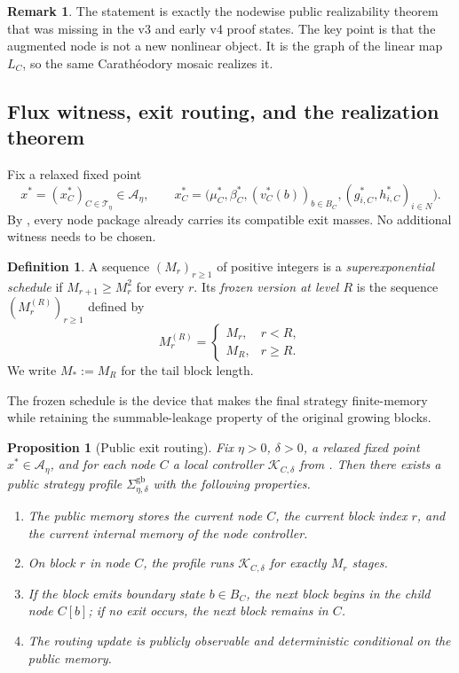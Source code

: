 \documentclass[12pt]{article}
\newtheorem{proposition}[theorem]{Proposition}
\theoremstyle{definition}
\newtheorem{definition}[theorem]{Definition}
\newtheorem{remark}[theorem]{Remark}
\newcommand{\1}{\mathbf{1}}
\newcommand{\cA}{\mathcal{A}}
\newcommand{\cK}{\mathcal{K}}
\newcommand{\cT}{\mathcal{T}}
\begin{document}
\begin{remark}
The statement is exactly the nodewise public realizability theorem that was missing in the
v3 and early v4 proof states.  The key point is that the augmented node is not a new
nonlinear object.  It is the graph of the linear map \(L_C\), so the same
Carath\'eodory mosaic realizes it.
\end{remark}

\subsection{Flux witness, exit routing, and the realization theorem}

Fix a relaxed fixed point
\[
x^*=(x_C^*)_{C\in \cT_\eta}\in \cA_\eta,
\qquad
x_C^*=\bigl(\mu_C^*,\beta_C^*,(v_C^*(b))_{b\in B_C},(g_{i,C}^*,h_{i,C}^*)_{i\in N}\bigr).
\]
By , every node package already carries its compatible exit masses.  No
additional witness needs to be chosen.

\begin{definition}
A sequence \((M_r)_{r\ge 1}\) of positive integers is a \emph{superexponential schedule}
if \(M_{r+1}\ge M_r^2\) for every \(r\).  Its \emph{frozen version at level \(R\)} is the
sequence \((M_r^{(R)})_{r\ge 1}\) defined by
\[
M_r^{(R)}=
\begin{cases}
M_r, & r<R,\\
M_R, & r\ge R.
\end{cases}
\]
We write \(M_*:=M_R\) for the tail block length.
\end{definition}

The frozen schedule is the device that makes the final strategy finite-memory while
retaining the summable-leakage property of the original growing blocks.

\begin{proposition}[Public exit routing]
\label{prop:routing}
Fix \(\eta>0\), \(\delta>0\), a relaxed fixed point \(x^*\in \cA_\eta\), and for each node
\(C\) a local controller \(\cK_{C,\delta}\) from .  Then there
exists a public strategy profile \(\Sigma_{\eta,\delta}^{\mathrm{gb}}\) with the following
properties.
\begin{enumerate}[label=\textnormal{(\roman*)},leftmargin=2.6em]
\item The public memory stores the current node \(C\), the current block index \(r\), and
the current internal memory of the node controller.
\item On block \(r\) in node \(C\), the profile runs \(\cK_{C,\delta}\) for exactly
\(M_r\) stages.
\item If the block emits boundary state \(b\in B_C\), the next block begins in the child
node \(C[b]\); if no exit occurs, the next block remains in \(C\).
\item The routing update is publicly observable and deterministic conditional on the public
memory.
\end{enumerate}
\end{proposition}
\end{document}
